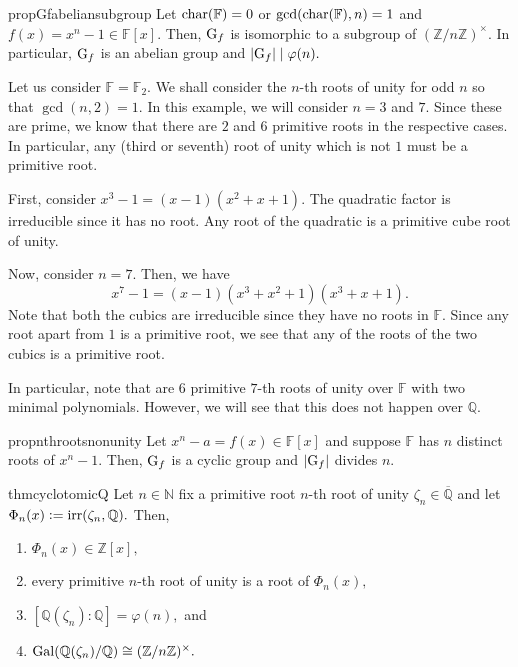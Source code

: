 \begin{restatable}[]{prop}{Gfabeliansubgroup}
\label{prop:Gfabeliansubgroup}
    Let $\operatorname{char}(\mathbb{F}) = 0$ or $\gcd(\operatorname{char}(\mathbb{F}), n) = 1$ and $f(x) = x^n - 1 \in \mathbb{F}[x].$ Then, $\operatorname{G}_f$ is isomorphic to a subgroup of $(\mathbb{Z}/n\mathbb{Z})^\times.$ In particular, $\operatorname{G}_f$ is an abelian group and ${\left\lvert \operatorname{G}_f \right\lvert} \mid \varphi(n).$ \hfill\hyperref[prop:Gfabeliansubgroup2]{\downsym}
\end{restatable}

\begin{ex} \label{ex:irrunityFtwo}
    Let us consider $\mathbb{F} = \mathbb{F}_2.$ We shall consider the $n$-th roots of unity for odd $n$ so that $\gcd(n, 2) = 1.$ In this example, we will consider $n = 3$ and $7.$ Since these are prime, we know that there are $2$ and $6$ primitive roots in the respective cases. In particular, any (third or seventh) root of unity which is not $1$ must be a primitive root.

    First, consider $x^3 - 1 = (x - 1)(x^2 + x + 1).$ The quadratic factor is irreducible since it has no root. Any root of the quadratic is a primitive cube root of unity.

    Now, consider $n = 7.$ Then, we have
    \begin{equation*} 
        x^7 - 1 = (x - 1)(x^3 + x^2 + 1)(x^3 + x + 1).
    \end{equation*}
    Note that both the cubics are irreducible since they have no roots in $\mathbb{F}.$ Since any root apart from $1$ is a primitive root, we see that any of the roots of the two cubics is a primitive root. 

    In particular, note that are $6$ primitive $7$-th roots of unity over $\mathbb{F}$ with two minimal polynomials. However, we will see that this does not happen over $\mathbb{Q}.$
\end{ex}

\begin{restatable}[]{prop}{nthrootsnonunity}
\label{prop:nthrootsnonunity}
    Let $x^n - a = f(x) \in \mathbb{F}[x]$ and suppose $\mathbb{F}$ has $n$ distinct roots of $x^n - 1.$ Then, $\operatorname{G}_f$ is a cyclic group and ${\left\lvert \operatorname{G}_f \right\lvert}$ divides $n.$ \hfill\hyperref[prop:nthrootsnonunity2]{\downsym}
\end{restatable}

\begin{restatable}[]{thm}{cyclotomicQ}
\label{thm:cyclotomicQ}
    Let $n \in \mathbb{N}$ fix a primitive root $n$-th root of unity $\zeta_n \in \overline{\mathbb{Q}}$ and let $\Phi_n(x) \vcentcolon= \operatorname{irr}(\zeta_n, \mathbb{Q}).$ Then,
    \begin{enumerate}
         \item $\Phi_n(x) \in \mathbb{Z}[x],$
         \item every primitive $n$-th root of unity is a root of $\Phi_n(x),$
         \item $[\mathbb{Q}(\zeta_n) : \mathbb{Q}] = \varphi(n),$ and
         \item $\operatorname{Gal}(\mathbb{Q}(\zeta_n)/\mathbb{Q}) \cong (\mathbb{Z}/n\mathbb{Z})^\times.$ \hfill\hyperref[thm:cyclotomicQ2]{\downsym}
     \end{enumerate} 
\end{restatable}

